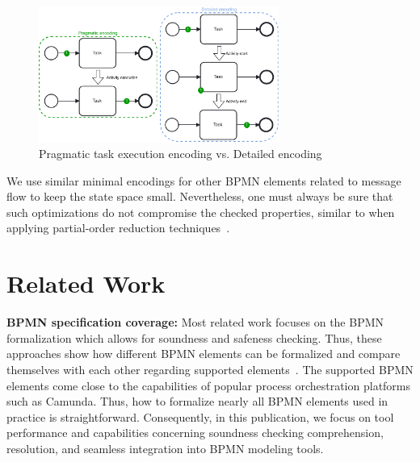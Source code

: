 \documentclass[runningheads]{llncs}
\begin{document}
\begin{figure}[ht]
	\centering
	\includegraphics[width=0.7\textwidth]{images/pragmatic-encoding}
	\caption{Pragmatic task execution encoding vs. Detailed encoding}
	\label{fig:activityEncoding}
\end{figure}

We use similar minimal encodings for other BPMN elements related to message flow to keep the state space small.
Nevertheless, one must always be sure that such optimizations do not compromise the checked properties, similar to when applying partial-order reduction techniques~\cite{valmariStateExplosionProblem1998}.

\section{Related Work}

\textbf{BPMN specification coverage:}
Most related work focuses on the BPMN formalization which allows for soundness and safeness checking.
Thus, these approaches show how different BPMN elements can be formalized and compare themselves with each other regarding supported elements~\cite{corradiniFormalApproachAnalysis2021,houhouFirstOrderLogicVerification2022,krauterFormalizationAnalysisBPMN2023,krauterHigherorderTransformationApproach2023}.
The supported BPMN elements come close to the capabilities of popular process orchestration platforms such as Camunda.
Thus, how to formalize nearly all BPMN elements used in practice is straightforward.
Consequently, in this publication, we focus on tool performance and capabilities concerning soundness checking comprehension, resolution, and seamless integration into BPMN modeling tools.
\end{document}
